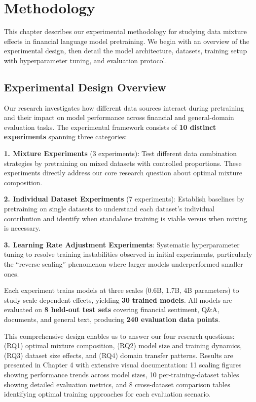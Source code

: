 \chapter{Methodology}

This chapter describes our experimental methodology for studying data mixture effects in financial language model pretraining. We begin with an overview of the experimental design, then detail the model architecture, datasets, training setup with hyperparameter tuning, and evaluation protocol.

\section{Experimental Design Overview}

Our research investigates how different data sources interact during pretraining and their impact on model performance across financial and general-domain evaluation tasks. The experimental framework consists of \textbf{10 distinct experiments} spanning three categories:

\textbf{1. Mixture Experiments} (3 experiments): Test different data combination strategies by pretraining on mixed datasets with controlled proportions. These experiments directly address our core research question about optimal mixture composition.

\textbf{2. Individual Dataset Experiments} (7 experiments): Establish baselines by pretraining on single datasets to understand each dataset's individual contribution and identify when standalone training is viable versus when mixing is necessary.

\textbf{3. Learning Rate Adjustment Experiments}: Systematic hyperparameter tuning to resolve training instabilities observed in initial experiments, particularly the ``reverse scaling'' phenomenon where larger models underperformed smaller ones.

Each experiment trains models at three scales (0.6B, 1.7B, 4B parameters) to study scale-dependent effects, yielding \textbf{30 trained models}. All models are evaluated on \textbf{8 held-out test sets} covering financial sentiment, Q\&A, documents, and general text, producing \textbf{240 evaluation data points}.

This comprehensive design enables us to answer our four research questions: (RQ1) optimal mixture composition, (RQ2) model size and training dynamics, (RQ3) dataset size effects, and (RQ4) domain transfer patterns. Results are presented in Chapter 4 with extensive visual documentation: 11 scaling figures showing performance trends across model sizes, 10 per-training-dataset tables showing detailed evaluation metrics, and 8 cross-dataset comparison tables identifying optimal training approaches for each evaluation scenario.

